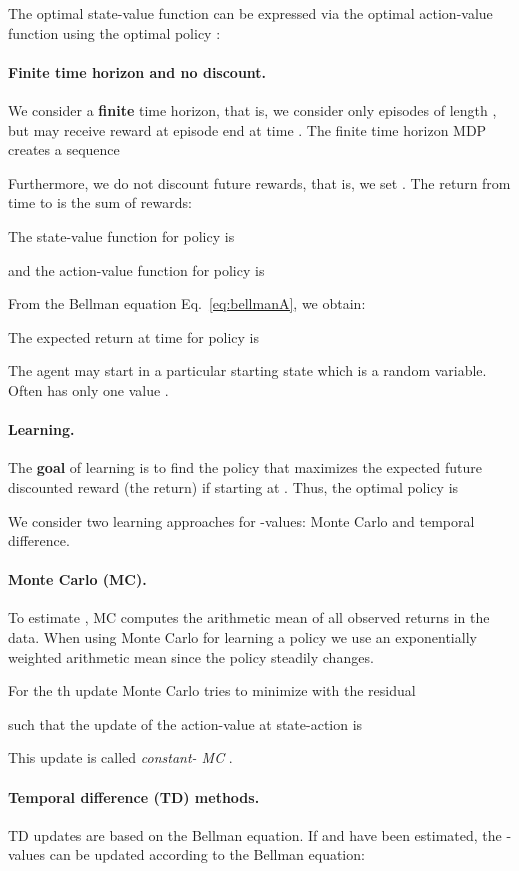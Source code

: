 \documentclass{article}
\begin{document}
\begin{appendices}
The optimal state-value function 
can be expressed via the optimal action-value
function   using the optimal policy : 


\paragraph{Finite time horizon and no discount.}
We consider a {\bf finite} time horizon, that is, we consider only
episodes of length , but may receive reward  at episode end at time .
The finite time horizon MDP creates a sequence

Furthermore, we do not discount future rewards, that is, we set .
The return  from time  to  is the sum of rewards:


The state-value function  for policy  is

and the action-value function  for policy  is


From the Bellman equation Eq.~\eqref{eq:bellmanA}, we obtain:
 

The expected return at time  for policy  is

The agent may start in a particular starting state  which is
a random variable. Often  has only one value .

\paragraph{Learning.}
The {\bf goal} of learning is to find the policy  that
maximizes the expected future discounted reward (the return)
if starting at . Thus, the optimal policy  is

We consider two learning approaches for -values: Monte Carlo and
temporal difference. 

\paragraph{Monte Carlo (MC).}
To estimate , MC computes the arithmetic mean of all observed
returns  in the data.
When using Monte Carlo for learning a policy we use an 
exponentially weighted arithmetic mean since the policy steadily changes.

For the th update Monte Carlo tries to minimize  with the residual 

such that the update of the action-value  at state-action  is
 
This update is called {\em constant- MC} \cite{Sutton:18book}.
 
\paragraph{Temporal difference (TD) methods.}
TD updates are based on the Bellman equation.
If  and
 have been estimated,
the -values can be updated according to the Bellman equation:


\end{appendices}
\end{document}
